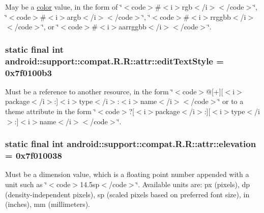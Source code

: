 May be a \hyperlink{classandroid_1_1support_1_1compat_1_1_r_1_1color}{color} value, in the form of \char`\"{}$<$code$>$\#$<$i$>$rgb$<$/i$>$$<$/code$>$\char`\"{}, \char`\"{}$<$code$>$\#$<$i$>$argb$<$/i$>$$<$/code$>$\char`\"{}, \char`\"{}$<$code$>$\#$<$i$>$rrggbb$<$/i$>$$<$/code$>$\char`\"{}, or \char`\"{}$<$code$>$\#$<$i$>$aarrggbb$<$/i$>$$<$/code$>$\char`\"{}. \hypertarget{classandroid_1_1support_1_1compat_1_1_r_1_1attr_a6c4187cc0d3d29abc38d74965e4d2d3}{
\subsubsection[{editTextStyle}]{\setlength{\rightskip}{0pt plus 5cm}static final int android::support::compat.R.R::attr::editTextStyle = 0x7f0100b3}}
\label{classandroid_1_1support_1_1compat_1_1_r_1_1attr_a6c4187cc0d3d29abc38d74965e4d2d3}


Must be a reference to another resource, in the form \char`\"{}$<$code$>$@\mbox{[}+\mbox{]}\mbox{[}$<$i$>$package$<$/i$>$:\mbox{]}$<$i$>$type$<$/i$>$:$<$i$>$name$<$/i$>$$<$/code$>$\char`\"{} or to a theme attribute in the form \char`\"{}$<$code$>$?\mbox{[}$<$i$>$package$<$/i$>$:\mbox{]}\mbox{[}$<$i$>$type$<$/i$>$:\mbox{]}$<$i$>$name$<$/i$>$$<$/code$>$\char`\"{}. \hypertarget{classandroid_1_1support_1_1compat_1_1_r_1_1attr_0eacd30601eef952571e2c08508d0d60}{
\subsubsection[{elevation}]{\setlength{\rightskip}{0pt plus 5cm}static final int android::support::compat.R.R::attr::elevation = 0x7f010038}}
\label{classandroid_1_1support_1_1compat_1_1_r_1_1attr_0eacd30601eef952571e2c08508d0d60}


Must be a dimension value, which is a floating point number appended with a unit such as \char`\"{}$<$code$>$14.5sp$<$/code$>$\char`\"{}. Available units are: px (pixels), dp (density-independent pixels), sp (scaled pixels based on preferred font size), in (inches), mm (millimeters). 

